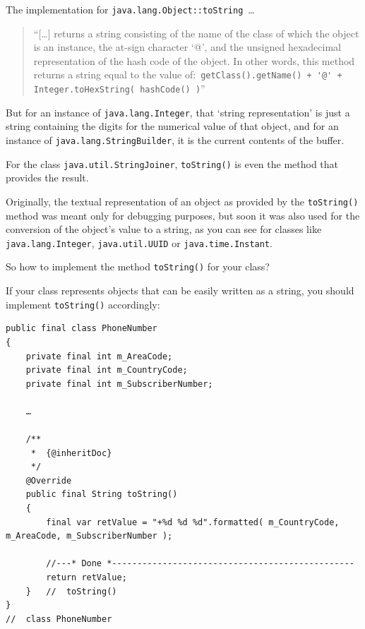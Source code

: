 The implementation for \lstinline|java.lang.Object::toString|~…
\begin{quote}
“[…] returns a string consisting of the name of the class of which the object is an instance, the at-sign character ‘@’, and the unsigned hexadecimal representation of the hash code of the object. In other words, this method returns a string equal to the value of:\
\lstinline|getClass().getName() + '@' + Integer.toHexString( hashCode() )|”
\end{quote}
But for an instance of \lstinline|java.lang.Integer|\autocite{ORACLE_DOC_INTEGER_CLASS}, that ‘string representation’ is just a string containing the digits for the numerical value of that object, and for an instance of \lstinline|java.lang.StringBuilder|\autocite{ORACLE_DOC_STRINGBUILDER_CLASS}, it is the current contents of the buffer.

For the class \lstinline|java.util.StringJoiner|\autocite{ORACLE_DOC_STRINGJOINER_CLASS}, \lstinline|toString()| is even the method that provides the result.

Originally, the textual representation of an object as provided by the \lstinline|toString()| method was meant only for debugging purposes, but soon it was also used for the conversion of the object's value to a string, as you can see for classes like \lstinline|java.lang.Integer|, \lstinline|java.util.UUID| or \lstinline|java.time.Instant|.

So how to implement the method \lstinline|toString()| for your class?

If your class represents objects that can be easily written as a string, you should implement \lstinline|toString()| accordingly:
\begin{lstlisting}
public final class PhoneNumber
{
    private final int m_AreaCode;
    private final int m_CountryCode;
    private final int m_SubscriberNumber;
    
    …
    
    /**
     *  {@inheritDoc}
     */
    @Override 
    public final String toString()
    {
        final var retValue = "+%d %d %d".formatted( m_CountryCode, m_AreaCode, m_SubscriberNumber );
        
        //---* Done *------------------------------------------------
        return retValue;
    }   //  toString()
}   
//  class PhoneNumber
\end{lstlisting}

